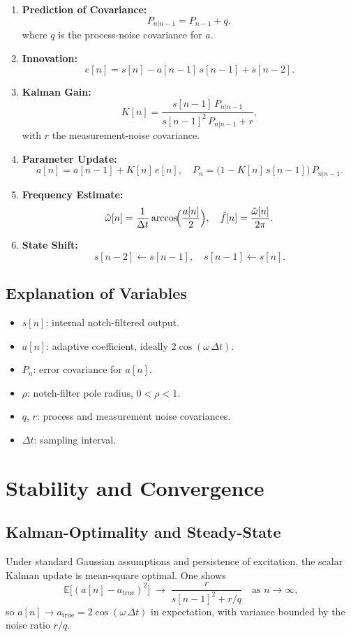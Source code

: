 \documentclass{article}
\begin{document}
\begin{enumerate}
  \item \textbf{Prediction of Covariance:}
    \[
      P_{n|n-1} = P_{n-1} + q,
    \]
    where \(q\) is the process-noise covariance for \(a\).
  \item \textbf{Innovation:}
    \[
      e[n] = s[n] - a[n-1]\,s[n-1] + s[n-2].
    \]
  \item \textbf{Kalman Gain:}
    \[
      K[n] = \frac{s[n-1]\,P_{n|n-1}}{s[n-1]^2\,P_{n|n-1} + r},
    \]
    with \(r\) the measurement-noise covariance.
  \item \textbf{Parameter Update:}
    \[
      a[n] = a[n-1] + K[n]\,e[n],
      \quad
      P_n = \bigl(1 - K[n]\,s[n-1]\bigr)\,P_{n|n-1}.
    \]
  \item \textbf{Frequency Estimate:}
    \[
      \hat\omega[n]
      = \frac{1}{\Delta t}\arccos\!\Bigl(\frac{a[n]}{2}\Bigr),
      \quad
      \hat f[n] = \frac{\hat\omega[n]}{2\pi}.
    \]
  \item \textbf{State Shift:}
    \[
      s[n-2]\gets s[n-1], 
      \quad 
      s[n-1]\gets s[n].
    \]
\end{enumerate}

\subsection{Explanation of Variables}
\begin{itemize}
  \item \(s[n]\): internal notch-filtered output.  
  \item \(a[n]\): adaptive coefficient, ideally \(2\cos(\omega\,\Delta t)\).  
  \item \(P_n\): error covariance for \(a[n]\).  
  \item \(\rho\): notch-filter pole radius, \(0<\rho<1\).  
  \item \(q\), \(r\): process and measurement noise covariances.  
  \item \(\Delta t\): sampling interval.  
\end{itemize}

\section{Stability and Convergence}

\subsection{Kalman-Optimality and Steady-State}
Under standard Gaussian assumptions and persistence of excitation, the scalar Kalman update is mean-square optimal.  One shows
\[
\mathbb{E}\bigl[(a[n] - a_{\mathrm{true}})^2\bigr]
\;\longrightarrow\;
\frac{r}{s[n-1]^2 + r/q}
\quad\text{as }n\to\infty,
\]
so \(a[n]\to a_{\mathrm{true}} = 2\cos(\omega\,\Delta t)\) in expectation, with variance bounded by the noise ratio \(r/q\).
\end{document}
